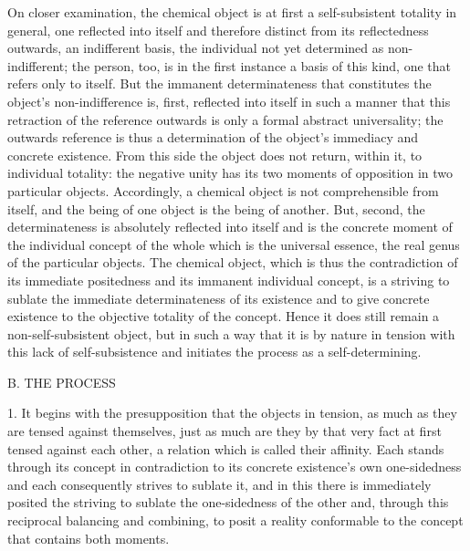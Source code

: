 On closer examination, the chemical object is
at first a self-subsistent totality in general,
one reflected into itself and therefore distinct
from its reflectedness outwards, an indifferent basis,
the individual not yet determined as non-indifferent;
the person, too, is in the first instance a basis
of this kind, one that refers only to itself.
But the immanent determinateness
that constitutes the object's non-indifference is,
first, reflected into itself in such a manner
that this retraction of the reference outwards is
only a formal abstract universality;
the outwards reference is thus a determination
of the object's immediacy and concrete existence.
From this side the object does not return,
within it, to individual totality:
the negative unity has its two moments
of opposition in two particular objects.
Accordingly, a chemical object is
not comprehensible from itself,
and the being of one object is
the being of another.
But, second, the determinateness is
absolutely reflected into itself
and is the concrete moment of
the individual concept of the whole
which is the universal essence,
the real genus of the particular objects.
The chemical object,
which is thus the contradiction
of its immediate positedness
and its immanent individual concept,
is a striving to sublate
the immediate determinateness of its existence
and to give concrete existence to
the objective totality of the concept.
Hence it does still remain a non-self-subsistent object,
but in such a way that it is by nature in tension
with this lack of self-subsistence
and initiates the process as a self-determining.

B. THE PROCESS

1. It begins with the presupposition
that the objects in tension,
as much as they are tensed against themselves,
just as much are they by that very fact
at first tensed against each other,
a relation which is called their affinity.
Each stands through its concept in contradiction
to its concrete existence's own one-sidedness
and each consequently strives to sublate it,
and in this there is immediately posited
the striving to sublate the one-sidedness of the other
and, through this reciprocal balancing and combining,
to posit a reality conformable to the concept
that contains both moments.

